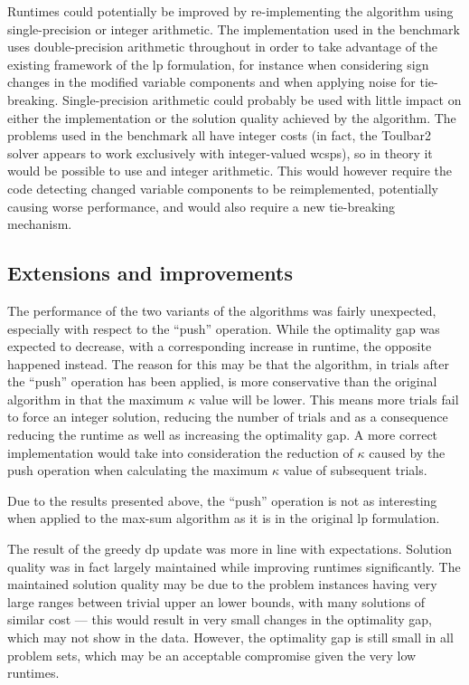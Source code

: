 Runtimes could potentially be improved by re-implementing the algorithm using single-precision or integer arithmetic.
The implementation used in the benchmark uses double-precision arithmetic throughout in order to take advantage of the existing framework of the \gls{lp} formulation, for instance when considering sign changes in the modified variable components and when applying noise for tie-breaking.
Single-precision arithmetic could probably be used with little impact on either the implementation or the solution quality achieved by the algorithm.
The problems used in the benchmark all have integer costs (in fact, the Toulbar2 solver appears to work exclusively with integer-valued \glspl{wcsp}), so in theory it would be possible to use and integer arithmetic.
This would however require the code detecting changed variable components to be reimplemented, potentially causing worse performance, and would also require a new tie-breaking mechanism.


\subsection{Extensions and improvements}
The performance of the two variants of the algorithms was fairly unexpected, especially with respect to the \enquote{push} operation.
While the optimality gap was expected to decrease, with a corresponding increase in runtime, the opposite happened instead.
The reason for this may be that the algorithm, in trials after the \enquote{push} operation has been applied, is more conservative than the original algorithm in that the maximum \(\kappa\) value will be lower. This means more trials fail to force an integer solution, reducing the number of trials and as a consequence reducing the runtime as well as increasing the optimality gap.
A more correct implementation would take into consideration the reduction of \(\kappa\) caused by the push operation when calculating the maximum \(\kappa\) value of subsequent trials.

Due to the results presented above, the \enquote{push} operation is not as interesting when applied to the max-sum algorithm as it is in the original \gls{lp} formulation.

The result of the greedy \gls{dp} update was more in line with expectations.
Solution quality was in fact largely maintained while improving runtimes significantly.
The maintained solution quality may be due to the problem instances having very large ranges between trivial upper an lower bounds, with many solutions of similar cost --- this would result in very small changes in the optimality gap, which may not show in the data.
However, the optimality gap is still small in all problem sets, which may be an acceptable compromise given the very low runtimes.

